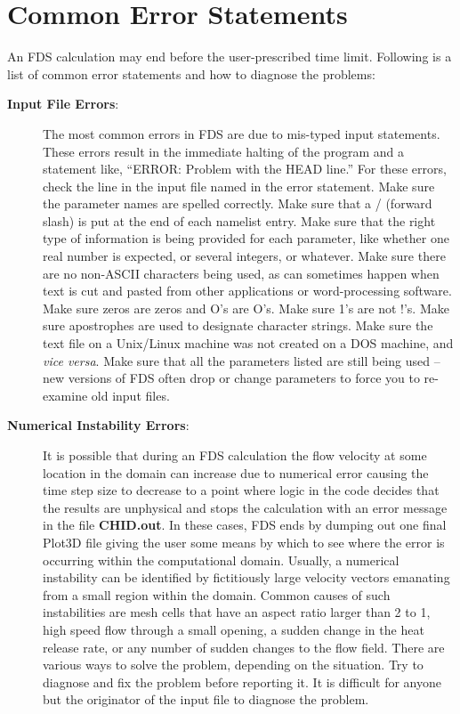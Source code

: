 \documentclass[11pt]{book}
\begin{document}
\section{Common Error Statements}%
An FDS calculation may end before the user-prescribed time limit.
Following is a list of common error statements and how to diagnose the problems:
\begin{description}
\item[{\bf Input File Errors}:] 
The most common errors in FDS are due to mis-typed input statements.
These errors result in the immediate halting of the program and a statement like, ``ERROR: Problem
with the HEAD line.'' For these errors, check the line in the input file named in the error statement.
Make sure the parameter names are spelled correctly. Make sure that a / (forward slash)
is put at the end of each namelist entry. Make sure that the right type of information is
being provided for each parameter, like whether one real number is expected, or several integers, or
whatever. Make sure there are no non-ASCII characters being used, as can sometimes happen when text is
cut and pasted from other applications or word-processing software. Make sure zeros are zeros and
O's are O's. Make sure 1's are not !'s. Make sure apostrophes are used to designate character strings.
Make sure the text file on a Unix/Linux machine was not created on a DOS machine, and {\em vice versa}.
Make sure that all the parameters listed are still being used -- new versions of FDS often drop or
change parameters to force you to re-examine old input files.

\item [{\bf Numerical Instability Errors}:] 
It is possible that during an FDS calculation the flow
velocity at some location in the domain can increase due to numerical error causing the time step
size to decrease to a point where logic in the code decides that the results are unphysical
and stops the calculation with an error message in the file {\bf CHID.out}.
In these cases, FDS ends by dumping out one final
Plot3D file giving the user some means by which to see where the
error is occurring within the computational domain. Usually, a numerical
instability can be identified by fictitiously large velocity vectors emanating from
a small region within the domain. Common causes of such instabilities are
mesh cells that have an aspect ratio larger than 2 to 1, high speed flow through a small
opening, a sudden change in the heat release rate, or any number of sudden changes to the
flow field. There are various ways to solve the problem, depending on the situation.
Try to diagnose and fix the problem before reporting it. It is difficult
for anyone but the originator of the input file to diagnose the problem.


\end{description}
\end{document}
